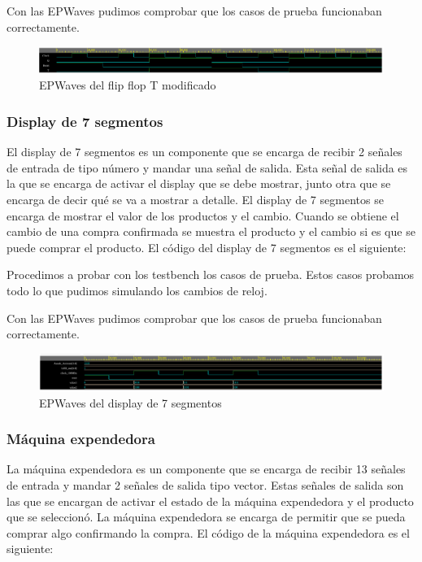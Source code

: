 \documentclass[12pt]{article}  %
\begin{document}
Con las EPWaves pudimos comprobar que los casos de prueba funcionaban correctamente.

\begin{figure}[!ht]
  \centering
  \caption{EPWaves del flip flop T modificado}
  \includegraphics[width=0.75\linewidth]{Imagenes/EPWaves/flipflop-wave.png}
\end{figure}

\subsubsection{Display de 7 segmentos}
El display de 7 segmentos es un componente que se encarga de recibir 2 señales de entrada de tipo número y mandar una señal de salida. Esta señal de salida es la que se encarga de activar el display que se debe mostrar, junto otra que se encarga de decir qué se va a mostrar a detalle. El display de 7 segmentos se encarga de mostrar el valor de los productos y el cambio. Cuando se obtiene el cambio de una compra confirmada se muestra el producto y el cambio si es que se puede comprar el producto. El código del display de 7 segmentos es el siguiente:



Procedimos a probar con los testbench los casos de prueba. Estos casos probamos todo lo que pudimos simulando los cambios de reloj.



Con las EPWaves pudimos comprobar que los casos de prueba funcionaban correctamente.

\begin{figure}[!ht]
  \centering
  \caption{EPWaves del display de 7 segmentos}
  \includegraphics[width=0.75\linewidth]{Imagenes/EPWaves/seven-seg-display-wave.png}
\end{figure}

\subsubsection{Máquina expendedora}
La máquina expendedora es un componente que se encarga de recibir 13 señales de entrada y mandar 2 señales de salida tipo vector. Estas señales de salida son las que se encargan de activar el estado de la máquina expendedora y el producto que se seleccionó. La máquina expendedora se encarga de permitir que se pueda comprar algo confirmando la compra. El código de la máquina expendedora es el siguiente:
\end{document}
